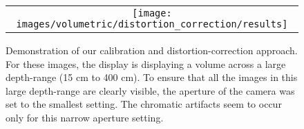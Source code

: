 \begin{figure} [ht]
\begin{center}
\begin{tabular}{c} 
\texttt{[image: images/volumetric/distortion\_correction/results]}
\end{tabular}
\end{center}
\label{fig:volumetric:distortion_correction:results} 
\caption[Volumetric NED: Results of optical calibration and distortion correction]{Demonstration of our calibration and distortion-correction approach. For these images, the display is displaying a volume across a large depth-range (15 cm to 400 cm). To ensure that all the images in this large depth-range are clearly visible, the aperture of the camera was set to the smallest setting. The chromatic artifacts seem to occur only for this narrow aperture setting.}
\end{figure} 
